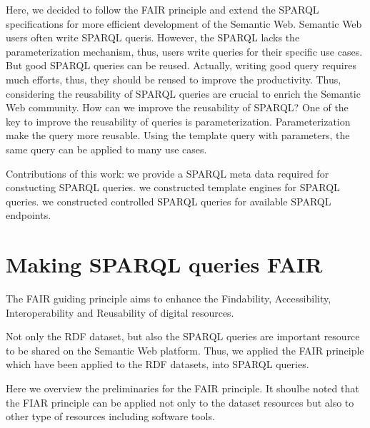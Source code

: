 \documentclass[runningheads]{llncs}
\begin{document}
Here, we decided to follow the FAIR principle and extend the SPARQL specifications for more efficient development of the Semantic Web.
Semantic Web users often write SPARQL queris.
However, the SPARQL lacks the parameterization mechanism, thus, users write queries for their specific use cases.
But good SPARQL queries can be reused.
Actually, writing good query requires much efforts, thus, they should be reused to improve the productivity.
Thus, considering the reusability of SPARQL queries are crucial to enrich the Semantic Web community.
How can we improve the reusability of SPARQL?
One of the key to improve the reusability of queries is parameterization.
Parameterization make the query more reusable.
Using the template query with parameters, the same query can be applied to many use cases.

Contributions of this work:
we provide a SPARQL meta data required for constucting SPARQL queries.
we constructed template engines for SPARQL queries.
we constructed controlled SPARQL queries for available SPARQL endpoints.






\section{Making SPARQL queries FAIR}
The FAIR guiding principle aims to enhance the Findability, Accessibility, Interoperability and Reusability of digital resources.

Not only the RDF dataset, but also the SPARQL queries are important resource to be shared on the Semantic Web platform. Thus, we applied the FAIR principle which have been applied to the RDF datasets, into SPARQL queries.

Here we overview the preliminaries for the FAIR principle.
It shoulbe noted that the FIAR principle can be applied not only to the dataset resources but also to other type of resources including software tools.
\end{document}
